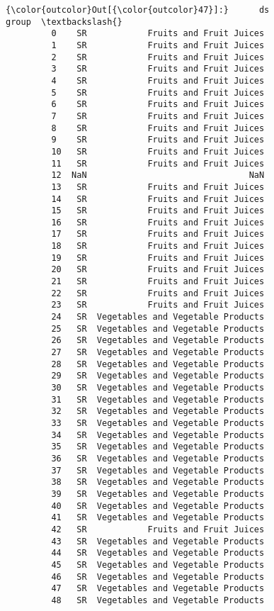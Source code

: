 \documentclass[11pt]{article}
\begin{document}
\begin{Verbatim}[commandchars=\\\{\}]
{\color{outcolor}Out[{\color{outcolor}47}]:}      ds                              group  \textbackslash{}
         0    SR            Fruits and Fruit Juices   
         1    SR            Fruits and Fruit Juices   
         2    SR            Fruits and Fruit Juices   
         3    SR            Fruits and Fruit Juices   
         4    SR            Fruits and Fruit Juices   
         5    SR            Fruits and Fruit Juices   
         6    SR            Fruits and Fruit Juices   
         7    SR            Fruits and Fruit Juices   
         8    SR            Fruits and Fruit Juices   
         9    SR            Fruits and Fruit Juices   
         10   SR            Fruits and Fruit Juices   
         11   SR            Fruits and Fruit Juices   
         12  NaN                                NaN   
         13   SR            Fruits and Fruit Juices   
         14   SR            Fruits and Fruit Juices   
         15   SR            Fruits and Fruit Juices   
         16   SR            Fruits and Fruit Juices   
         17   SR            Fruits and Fruit Juices   
         18   SR            Fruits and Fruit Juices   
         19   SR            Fruits and Fruit Juices   
         20   SR            Fruits and Fruit Juices   
         21   SR            Fruits and Fruit Juices   
         22   SR            Fruits and Fruit Juices   
         23   SR            Fruits and Fruit Juices   
         24   SR  Vegetables and Vegetable Products   
         25   SR  Vegetables and Vegetable Products   
         26   SR  Vegetables and Vegetable Products   
         27   SR  Vegetables and Vegetable Products   
         28   SR  Vegetables and Vegetable Products   
         29   SR  Vegetables and Vegetable Products   
         30   SR  Vegetables and Vegetable Products   
         31   SR  Vegetables and Vegetable Products   
         32   SR  Vegetables and Vegetable Products   
         33   SR  Vegetables and Vegetable Products   
         34   SR  Vegetables and Vegetable Products   
         35   SR  Vegetables and Vegetable Products   
         36   SR  Vegetables and Vegetable Products   
         37   SR  Vegetables and Vegetable Products   
         38   SR  Vegetables and Vegetable Products   
         39   SR  Vegetables and Vegetable Products   
         40   SR  Vegetables and Vegetable Products   
         41   SR  Vegetables and Vegetable Products   
         42   SR            Fruits and Fruit Juices   
         43   SR  Vegetables and Vegetable Products   
         44   SR  Vegetables and Vegetable Products   
         45   SR  Vegetables and Vegetable Products   
         46   SR  Vegetables and Vegetable Products   
         47   SR  Vegetables and Vegetable Products   
         48   SR  Vegetables and Vegetable Products   
         

\end{Verbatim}
\end{document}
